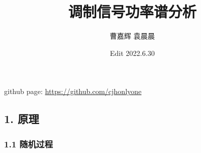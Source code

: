 \documentclass[
]{article}
\title{\huge \textbf{调制信号功率谱分析}}
\author{曹嘉辉 \space 袁晨晨}
\date{Edit 2022.6.30}
\begin{document}
\maketitle

github page: \url{https://github.com/cjhonlyone}

\tableofcontents

\newpage
\hypertarget{header-n3}{%
\subsection{1. 原理}\label{header-n3}}

\hypertarget{header-n4}{%
\subsubsection{1.1 随机过程}\label{header-n4}}
\end{document}
